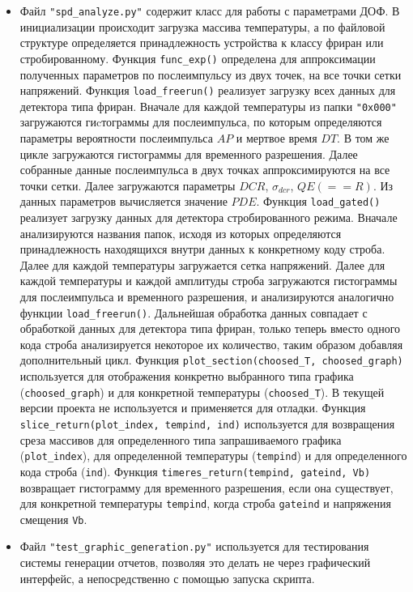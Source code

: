 \documentclass[12pt]{article}
\begin{document}
\begin{itemize}
   \item Файл \verb|"spd_analyze.py"| содержит класс для работы с параметрами ДОФ. В инициализации происходит загрузка массива температуры, а по файловой структуре определяется принадлежность устройства к классу фриран или стробированному. Функция \verb|func_exp()| определена для аппроксимации полученных параметров по послеимпульсу из двух точек, на все точки сетки напряжений. Функция \verb|load_freerun()| реализует загрузку всех данных для детектора типа фриран. Вначале для каждой температуры из папки \verb|"0x000"| загружаются гиcтограммы для  послеимпульса, по которым определяются  параметры вероятности послеимпульса $AP$ и мертвое время $DT$. В том же цикле загружаются гистограммы для временного разрешения. Далее собранные данные послеимпульса в двух точках аппроксимируются на все точки сетки. Далее загружаются параметры $DCR$, $\sigma_{dcr}$, $QE (==R)$. Из данных параметров вычисляется значение $PDE$. Функция \verb|load_gated()| реализует загрузку данных для детектора стробированного режима. Вначале анализируются названия папок, исходя из которых определяются принадлежность находящихся внутри данных к конкретному коду строба. Далее для каждой температуры загружается сетка напряжений. Далее для каждой температуры и каждой амплитуды строба загружаются гистограммы для послеимпульса и временного разрешения, и анализируются аналогично функции \verb|load_freerun()|. Дальнейшая обработка данных совпадает с обработкой данных для детектора типа фриран, только теперь вместо одного кода строба анализируется некоторое их количество, таким образом добавляя дополнительный цикл. Функция \verb|plot_section(choosed_T, choosed_graph)| используется для отображения конкретно выбранного типа графика (\verb|choosed_graph|) и для конкретной температуры (\verb|choosed_T|). В текущей версии проекта не  используется и применяется для отладки. Функция \verb|slice_return(plot_index, tempind, ind)| используется для возвращения среза массивов для определенного типа запрашиваемого графика (\verb|plot_index|), для определенной температуры (\verb|tempind|) и для определенного кода строба (\verb|ind|).  Функция \verb|timeres_return(tempind, gateind, Vb)| возвращает гистограмму для временного разрешения, если она существует, для конкретной температуры \verb|tempind|, когда строба \verb|gateind| и напряжения смещения \verb|Vb|. 
   
   \item Файл \verb|"test_graphic_generation.py"| используется для тестирования системы генерации отчетов, позволяя это делать не через графический интерфейс, а непосредственно с помощью запуска скрипта. 
   

\end{itemize}
\end{document}
